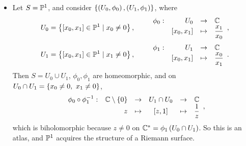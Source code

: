\begin{example}
\hfill
\begin{itemize}
\item Let $ S = \P^1 $, and consider $ \cb{\rb{U_0, \phi_0}, \rb{U_1, \phi_1}} $, where
$$ U_0 = \cb{\sb{x_0, x_1} \in \P^1 \mid x_0 \ne 0}, \qquad \function[\phi_0]{U_0}{\C}{\sb{x_0, x_1}}{\dfrac{x_1}{x_0}}, $$
$$ U_1 = \cb{\sb{x_0, x_1} \in \P^1 \mid x_1 \ne 0}, \qquad \function[\phi_1]{U_1}{\C}{\sb{x_0, x_1}}{\dfrac{x_0}{x_1}}. $$
Then $ S = U_0 \cup U_1 $, $ \phi_0, \phi_1 $ are homeomorphic, and on $ U_0 \cap U_1 = \cb{x_0 \ne 0, \ x_1 \ne 0} $,
$$
\begin{array}{crcccl}
\phi_0 \circ \phi_1^{-1} : & \C \setminus \cb{0} & \to & U_1 \cap U_0 & \to & \C \\
& z & \mapsto & \sb{z, 1} & \mapsto & \dfrac{1}{z}
\end{array},
$$
which is biholomorphic because $ z \ne 0 $ on $ \C^* = \phi_1\rb{U_0 \cap U_1} $. So this is an atlas, and $ \P^1 $ acquires the structure of a Riemann surface.



\end{itemize}
\end{example}
